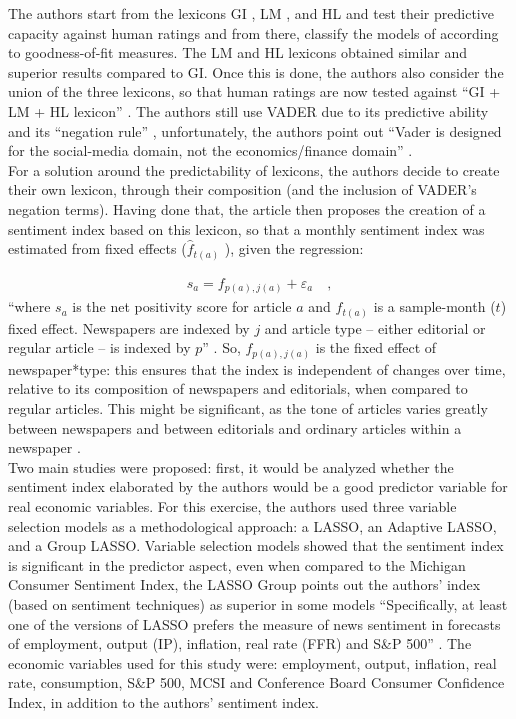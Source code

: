 The authors start from the lexicons GI \cite[]{heston2017news}, LM \cite[]{loughran2011liability}, and HL \cite[]{hu2004mining} and test their predictive capacity against human ratings and from there, classify the models of according to goodness-of-fit measures. The LM and HL lexicons obtained similar and superior results compared to GI. Once this is done, the authors also consider the union of the three lexicons, so that human ratings are now tested against ``GI + LM + HL lexicon'' \cite[p. 13]{shapiro2020measuring}. The authors still use VADER \cite[]{hutto2014vader} due to its predictive ability and its ``negation rule'' \cite[]{potts2010negativity}, unfortunately, the authors point out ``Vader is designed for the social-media domain, not the economics/finance domain'' \cite[p. 14]{shapiro2020measuring}.\\

For a solution around the predictability of lexicons, the authors decide to create their own lexicon, through their composition (and the inclusion of VADER's negation terms). Having done that, the article then proposes the creation of a sentiment index based on this lexicon, so that a monthly sentiment index was estimated from fixed effects ($\hat{f}_{t(a)}$ ), given the regression:

\begin{align*}
    s_a = f_{p(a), j(a)} + \varepsilon_a \quad ,
\end{align*}
``where $s_a$ is the net positivity score for article $a$ and $f_{t(a)}$ is a sample-month ($t$) fixed effect. Newspapers are indexed by $j$ and article type -- either editorial or regular article -- is indexed by $p$'' \cite[p. 20]{shapiro2020measuring}. So, $f_{p(a), j(a)}$ is the fixed effect of newspaper*type: this ensures that the index is independent of changes over time, relative to its composition of newspapers and editorials, when compared to regular articles. This might be significant, as the tone of articles varies greatly between newspapers and between editorials and ordinary articles within a newspaper \cite[p. 20]{shapiro2020measuring}.\\

Two main studies were proposed: first, it would be analyzed whether the sentiment index elaborated by the authors would be a good predictor variable for real economic variables. For this exercise, the authors used three variable selection models as a methodological approach: a LASSO, an Adaptive LASSO, and a Group LASSO. Variable selection models showed that the sentiment index is significant in the predictor aspect, even when compared to the Michigan Consumer Sentiment Index, the LASSO Group points out the authors' index (based on sentiment techniques) as superior in some models ``Specifically, at least one of the versions of LASSO prefers the measure of news sentiment in forecasts of employment, output (IP), inflation, real rate (FFR) and S\&P 500'' \cite[p.26]{shapiro2020measuring}. The economic variables used for this study were: employment, output, inflation, real rate, consumption, S\&P 500, MCSI and Conference Board Consumer Confidence Index, in addition to the authors' sentiment index.\\

